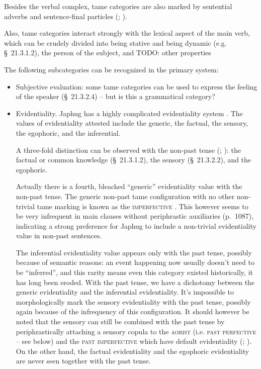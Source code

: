 \documentclass[a4paper, oneside, 12pt]{report}
\newcommand*{\citesec}[1]{\S~{#1}}
\newcommand*{\citetable}[1]{Table~{#1}}
\newcommand*{\citepage}[1]{p.~{#1}}
\newcommand{\category}[1]{\textsc{#1}}
\begin{document}
Besides the verbal complex, \acs{tame} categories are also marked by 
sentential adverbs and sentence-final particles 
(\citealt[\citepage{518}]{jacques2019egophoric}; \citealt[\citesec{21.8}]{jacques2021grammar}).

Also, \acs{tame} categories interact strongly with 
the lexical aspect of the main verb,
which can be crudely divided into being stative 
and being dynamic (e.g. \citesec{21.3.1.2}),
the person of the subject, and  TODO: other properties

The following subcategories can be recognized in the primary system:
\begin{itemize}
    \item Subjective evaluation: some \acs{tame} categories can be used to express 
    the feeling of the speaker (\citesec{21.3.2.4}) -- but is this a grammatical category?
    \item Evidentiality.
    Japhug has a highly complicated evidentiality system 
    \citep[\citetable{31.4}]{jacques2015sketch}.
    The values of evidentiality attested include 
    the generic, the factual, the sensory, the egophoric, and the inferential.

    A three-fold distinction can be observed with the non-past tense
    (\citealt[\citesec{21.3.4}]{jacques2021grammar}; 
    \citealt[\citesec{517}]{jacques2019egophoric}): 
    the factual or common knowledge (\citesec{21.3.1.2}), 
    the sensory (\citesec{21.3.2.2}),
    and the egophoric.

    Actually there is a fourth, bleached ``generic'' evidentiality value 
    with the non-past tense.
    The generic non-past \acs{tame} configuration 
    with no other non-trivial \acs{tame} marking 
    is known as the \category{imperfective} \citep[\citesec{21.2}]{jacques2021grammar}.
    This however seems to be very infrequent in main clauses
    without periphrastic auxiliaries (\citepage{1087}),
    indicating a strong preference for Japhug 
    to include a non-trivial evidentiality value in non-past sentences.
    
    The inferential evidentiality value appears only with the past tense,
    possibly because of semantic reasons: 
    an event happening now usually doesn't need to be ``inferred'',
    and this rarity means even this category existed historically,
    it has long been eroded.
    With the past tense, 
    we have a dichotomy between the generic evidentiality and the inferential evidentiality.
    It's impossible to morphologically mark the sensory evidentiality
    with the past tense, 
    possibly again because of the infrequency of this configuration.  
    It should however be noted that 
    the sensory can still be combined with the past tense 
    by periphrastically attaching a sensory copula 
    to the \category{aorist} (i.e. \category{past perfective} -- see below) 
    and the \category{past imperfective}
    which have default evidentiality
    (\citealt[\citesec{21.5.1.8}, \citesec{21.5.3.5}]{jacques2021grammar}; 
    \citealt[\citepage{518}]{jacques2019egophoric}). 
    On the other hand, the factual evidentiality and the egophoric evidentiality
    are never seen together with the past tense.


\end{itemize}
\end{document}
